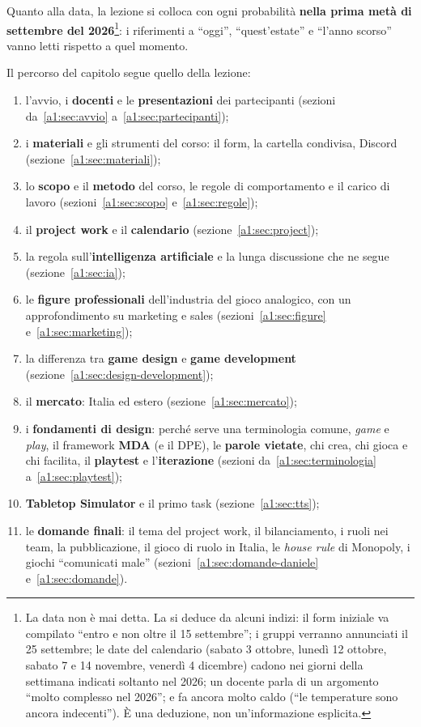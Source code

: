 Quanto alla data, la lezione si colloca con ogni probabilità \textbf{nella prima
metà di settembre del 2026}\footnote{La data non è mai detta. La si deduce da
alcuni indizi: il form iniziale va compilato ``entro e non oltre il 15
settembre''; i gruppi verranno annunciati il 25 settembre; le date del
calendario (sabato 3 ottobre, lunedì 12 ottobre, sabato 7 e 14 novembre,
venerdì 4 dicembre) cadono nei giorni della settimana indicati soltanto nel
2026; un docente parla di un argomento ``molto complesso nel 2026''; e fa
ancora molto caldo (``le temperature sono ancora indecenti''). È una
deduzione, non un'informazione esplicita.}: i riferimenti a ``oggi'',
``quest'estate'' e ``l'anno scorso'' vanno letti rispetto a quel momento.

Il percorso del capitolo segue quello della lezione:
\begin{enumerate}
  \item l'avvio, i \textbf{docenti} e le \textbf{presentazioni} dei partecipanti
        (sezioni da~\ref{a1:sec:avvio} a~\ref{a1:sec:partecipanti});
  \item i \textbf{materiali} e gli strumenti del corso: il form, la cartella
        condivisa, Discord (sezione~\ref{a1:sec:materiali});
  \item lo \textbf{scopo} e il \textbf{metodo} del corso, le regole di
        comportamento e il carico di lavoro (sezioni~\ref{a1:sec:scopo}
        e~\ref{a1:sec:regole});
  \item il \textbf{project work} e il \textbf{calendario} (sezione~\ref{a1:sec:project});
  \item la regola sull'\textbf{intelligenza artificiale} e la lunga discussione
        che ne segue (sezione~\ref{a1:sec:ia});
  \item le \textbf{figure professionali} dell'industria del gioco analogico,
        con un approfondimento su marketing e sales
        (sezioni~\ref{a1:sec:figure} e~\ref{a1:sec:marketing});
  \item la differenza tra \textbf{game design} e \textbf{game development}
        (sezione~\ref{a1:sec:design-development});
  \item il \textbf{mercato}: Italia ed estero (sezione~\ref{a1:sec:mercato});
  \item i \textbf{fondamenti di design}: perché serve una terminologia comune,
        \emph{game} e \emph{play}, il framework \textbf{MDA} (e il DPE), le
        \textbf{parole vietate}, chi crea, chi gioca e chi facilita, il
        \textbf{playtest} e l'\textbf{iterazione} (sezioni
        da~\ref{a1:sec:terminologia} a~\ref{a1:sec:playtest});
  \item \textbf{Tabletop Simulator} e il primo task (sezione~\ref{a1:sec:tts});
  \item le \textbf{domande finali}: il tema del project work, il bilanciamento,
        i ruoli nei team, la pubblicazione, il gioco di ruolo in Italia, le
        \emph{house rule} di Monopoly, i giochi ``comunicati male''
        (sezioni~\ref{a1:sec:domande-daniele} e~\ref{a1:sec:domande}).
\end{enumerate}

